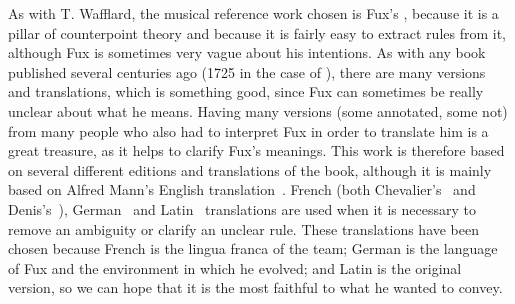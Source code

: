 As with T. Wafflard, the musical reference work chosen is Fux's \gap, because it is a pillar of counterpoint theory and because it is fairly easy to extract rules from it, although Fux is sometimes very vague about his intentions. As with any book published several centuries ago (1725 in the case of \gap), there are many versions and translations, which is something good, since Fux can sometimes be really unclear about what he means. Having many versions (some annotated, some not) from many people who also had to interpret Fux in order to translate him is a great treasure, as it helps to clarify Fux's meanings. This work is therefore based on several different editions and translations of the book, although it is mainly based on Alfred Mann's English translation~\cite{GaPEng}. French (both Chevalier's~\cite{GaPFrChevalier} and Denis's~\cite{GaPFrDenis}), German~\cite{GaPDe} and Latin~\cite{GapLa} translations are used when it is necessary to remove an ambiguity or clarify an unclear rule. These translations have been chosen because French is the lingua franca of the team; German is the language of Fux and the environment in which he evolved; and Latin is the original version, so we can hope that it is the most faithful to what he wanted to convey.






